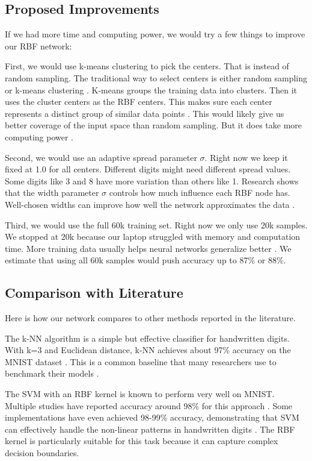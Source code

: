 \documentclass[12pt]{article}
\begin{document}
\subsection{Proposed Improvements}

If we had more time and computing power, we would try a few things to improve our RBF network:


First, we would use k-means clustering to pick the centers. That is instead of random sampling. The traditional way to select centers is either random sampling or k-means clustering \cite{soper2023}. K-means groups the training data into clusters. Then it uses the cluster centers as the RBF centers. This makes sure each center represents a distinct group of similar data points \cite{soper2023}. This would likely give us better coverage of the input space than random sampling. But it does take more computing power \cite{soper2023}.


Second, we would use an adaptive spread parameter $\sigma$. Right now we keep it fixed at 1.0 for all centers. Different digits might need different spread values. Some digits like 3 and 8 have more variation than others like 1. Research shows that the width parameter $\sigma$ controls how much influence each RBF node has. Well-chosen widths can improve how well the network approximates the data \cite{soper2023}.


Third, we would use the full 60k training set. Right now we only use 20k samples. We stopped at 20k because our laptop struggled with memory and computation time. More training data usually helps neural networks generalize better \cite{yu2008}. We estimate that using all 60k samples would push accuracy up to 87\% or 88\%.

\subsection{Comparison with Literature}

Here is how our network compares to other methods reported in the literature.

The k-NN algorithm is a simple but effective classifier for handwritten digits. With k=3 and Euclidean distance, k-NN achieves about 97\% accuracy on the MNIST dataset \cite{mnist-knn}. This is a common baseline that many researchers use to benchmark their models \cite{mnist-knn}. 

The SVM with an RBF kernel is known to perform very well on MNIST. Multiple studies have reported accuracy around 98\% for this approach \cite{svm-rbf-98}. Some implementations have even achieved 98-99\% accuracy, demonstrating that SVM can effectively handle the non-linear patterns in handwritten digits \cite{svm-jbst}. The RBF kernel is particularly suitable for this task because it can capture complex decision boundaries.
\end{document}
